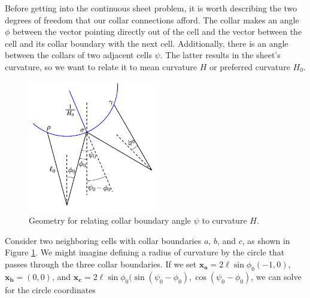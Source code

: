 
Before getting into the continuous sheet problem, it is worth describing the two degrees of freedom that our collar connections afford. 
The collar makes an angle $\phi$ between the vector pointing directly out of the cell and the vector between the cell and its collar boundary with the next cell. 
Additionally, there is an angle between the collars of two adjacent cells $\psi$. The latter results in the sheet's curvature, so we want to relate it to mean curvature $H$ or preferred curvature $H_0$. 


\begin{figure}[htbp]
    \centering
    \includegraphics[width=0.5\textwidth]{hpsi.png}
    \caption[Geometry of sheet curvature]{Geometry for relating collar boundary angle $\psi$ to curvature $H$. }
    \label{fig:hpsi}
\end{figure}

Consider two neighboring cells with collar boundaries $a$, $b$, and $c$, as shown in Figure \ref{fig:hpsi}. We might imagine defining a radius of curvature by the circle that passes through the three collar boundaries. If we set $\bm{x_a} = 2\ell\sin\phi_0(-1, 0)$, $\bm{x_b} = (0,0)$, and $\bm{x_c} = 2\ell\sin\phi_0 (\sin(\psi_0 - \phi_0), \cos(\psi_0-\phi_0)$, we can solve for the circle coordinates 

